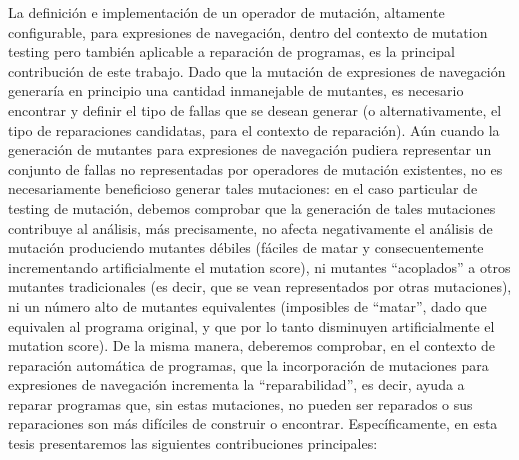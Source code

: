 La definici\'on e implementaci\'on de un operador de mutaci\'on, altamente configurable, para expresiones de navegaci\'on, dentro del contexto de mutation testing pero tambi\'en aplicable a reparaci\'on de programas, es la principal contribuci\'on de este trabajo. Dado que la mutaci\'on de expresiones de navegaci\'on generar\'ia en principio una cantidad inmanejable de mutantes, es necesario encontrar y definir el tipo de fallas que se desean generar (o alternativamente, el tipo de reparaciones candidatas, para el contexto de reparaci\'on). A\'un cuando la generaci\'on de mutantes para expresiones de navegaci\'on pudiera representar un conjunto de fallas no representadas por operadores de mutaci\'on existentes, no es necesariamente beneficioso generar tales mutaciones: en el caso particular de testing de mutaci\'on, debemos comprobar que la generaci\'on de tales mutaciones contribuye al an\'alisis, m\'as precisamente, no afecta negativamente el an\'alisis de mutaci\'on produciendo mutantes d\'ebiles (f\'aciles de matar y consecuentemente incrementando artificialmente el mutation score), ni mutantes ``acoplados'' a otros mutantes tradicionales (es decir, que se vean representados por otras mutaciones), ni un n\'umero alto de mutantes equivalentes (imposibles de ``matar'', dado que equivalen al programa original, y que por lo tanto disminuyen artificialmente el mutation score). De la misma manera, deberemos comprobar, en el contexto de reparaci\'on autom\'atica de programas, que la incorporaci\'on de mutaciones para expresiones de navegaci\'on incrementa la ``reparabilidad'', es decir, ayuda a reparar programas que, sin estas mutaciones, no pueden ser reparados o sus reparaciones son m\'as dif\'iciles de construir o encontrar. Espec\'ificamente, en esta tesis presentaremos las siguientes contribuciones principales:

